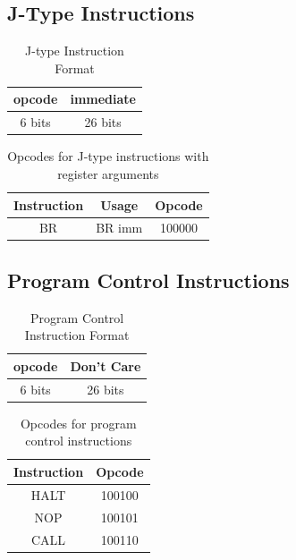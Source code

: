 \documentclass{article}
\begin{document}
\subsection{J-Type Instructions}

\begin{table}[H]
    \centering
    \begin{tabular}{|c|c|}
        \hline
        \textbf{opcode} & \textbf{immediate} \\
        \hline
        6 bits & 26 bits \\
        \hline
    \end{tabular}
    \caption{J-type Instruction Format}
\end{table}

\begin{table}[H]
    \centering
    \begin{tabular}{|c|c|c|}
        \hline
        \textbf{Instruction} & \textbf{Usage} & \textbf{Opcode} \\
        \hline
        BR & BR imm & 100000 \\
        \hline
    \end{tabular}
    \caption{Opcodes for J-type instructions with register arguments}
\end{table}

\subsection{Program Control Instructions}
\begin{table}[H]
    \centering
    \begin{tabular}{|c|c|}
        \hline
        \textbf{opcode} & \textbf{Don't Care} \\
        \hline
        6 bits & 26 bits \\
        \hline
    \end{tabular}
    \caption{Program Control Instruction Format}
\end{table}

\begin{table}[H]
    \centering
    \begin{tabular}{|c|c|}
        \hline
        \textbf{Instruction} & \textbf{Opcode} \\
        \hline
        HALT  & 100100 \\
        NOP  & 100101 \\
        CALL & 100110 \\
        \hline
    \end{tabular}
    \caption{Opcodes for program control instructions}
\end{table}
\end{document}
